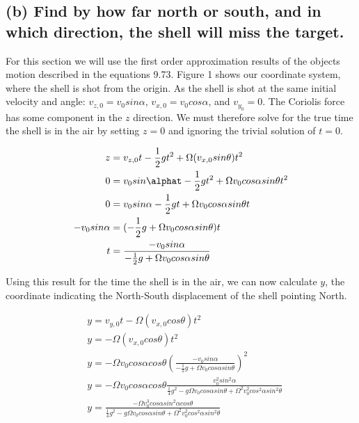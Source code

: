 \documentclass{article}
\begin{document}
\subsection*{(b) Find by how far north or south, and in which direction, the shell will miss the target.}

For this section we will use the first order approximation results of the objects motion described in the equations 9.73. Figure 1 shows our coordinate system, where the shell is shot from the origin. As the shell is shot at the same initial velocity and angle: $v_{z,0} = v_0sin\alpha$, $v_{x,0} = v_0cos\alpha$, and $v_{y_0} = 0$. The Coriolis force has some component in the $z$ direction. We must therefore solve for the true time the shell is in the air by setting $z = 0 $ and ignoring the trivial solution of $t=0$. 

\begin{align*}
    z &= v_{z,0}t - \frac{1}{2}gt^2 + \Omega(v_{x,0}sin\theta)t^2 \\
    0 &= v_0sin\alphat - \frac{1}{2}gt^2 + \Omega v_0cos\alpha sin\theta t^2 \\
    0 &= v_0sin\alpha - \frac{1}{2}gt + \Omega v_0cos\alpha sin\theta t \\
    -v_0sin\alpha &=  (- \frac{1}{2}g + \Omega v_0cos\alpha sin\theta )t \\
    t &= \frac{-v_0sin\alpha}{- \frac{1}{2}g + \Omega v_0cos\alpha sin\theta}
\end{align*}

Using this result for the time the shell is in the air, we can now calculate $y$, the coordinate indicating the North-South displacement of the shell pointing North. 

\begin{align*}
    &y = v_{y,0}t - \Omega (v_{x,0}cos \theta ) t^2\\
    &y = - \Omega (v_{x,0}cos \theta ) t^2\\
    &y= -\Omega v_0cos\alpha cos\theta \left( \frac{-v_0sin\alpha}{- \frac{1}{2}g + \Omega v_0cos\alpha sin\theta}\right)^2 \\
    &y= -\Omega v_0cos\alpha cos\theta \frac{v_0^2 sin^2\alpha}{ \frac{1}{4}g^2 - g\Omega v_0cos\alpha sin\theta+ \Omega^2 v_0^2cos^2\alpha sin^2\theta} \\
    &\boxed{ y= \frac{-\Omega v_0^3 cos\alpha sin^2\alpha cos\theta}{\frac{1}{4}g^2 - g\Omega v_0cos\alpha sin\theta+ \Omega^2 v_0^2cos^2\alpha sin^2\theta} }
\end{align*}
\end{document}
